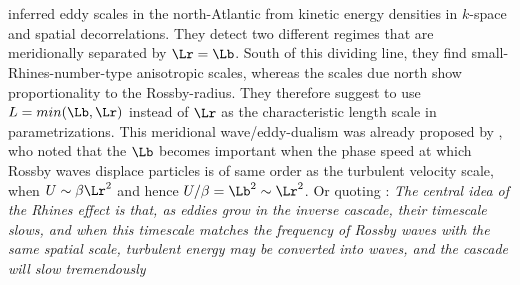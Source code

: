 \section*{\citealt{Eden2007}}\label{sec:hist_eden07}
\citeauthor*{Eden2007} inferred eddy scales in the north-Atlantic from kinetic energy densities in $k$-space and spatial decorrelations. They detect two different regimes that are meridionally separated by $\Lr=\Lb$. South of this dividing line, they find small-Rhines-number-type anisotropic scales, whereas the scales due north show proportionality to the Rossby-radius. They therefore suggest to use $L=min(\Lb,\Lr)$ instead of $\Lr$ as the characteristic length scale in parametrizations.
This meridional wave/eddy-dualism was already proposed by \cite{rhines1979theoretical}, who noted that the $\Lb$ becomes important when the phase speed at which Rossby waves displace particles is of same order as the turbulent velocity scale, \ie when $U \sim \beta\Lr^2$ and hence $U/\beta = \Lb^2 \sim \Lr^2$. Or quoting \cite{Tulloch2009}: \textit{The central idea of the Rhines effect is that, as eddies grow in the inverse cascade, their timescale slows, and when this timescale matches the frequency of Rossby waves with the same spatial scale, turbulent energy may be converted into waves, and the cascade will slow tremendously}


